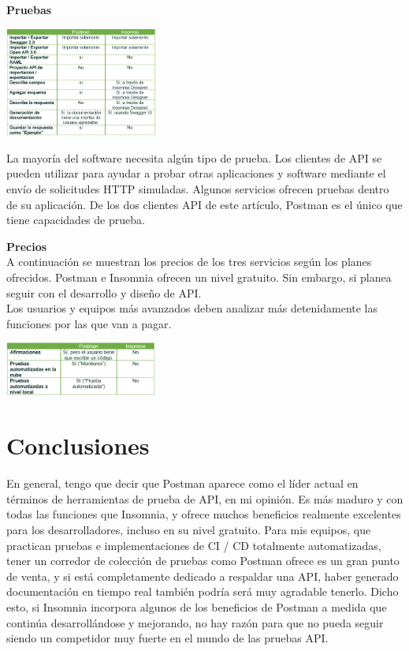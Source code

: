 \documentclass[twoside,twocolumn]{article}
\begin{document}
\textbf{Pruebas}\\


\begin{center}
	\includegraphics[width=5cm]{./img/22.png} 
\end{center}

La mayoría del software necesita algún tipo de prueba. Los clientes de API se pueden utilizar para ayudar a probar otras aplicaciones y software mediante el envío de solicitudes HTTP simuladas. Algunos servicios ofrecen pruebas dentro de su aplicación. De los dos clientes API de este artículo, Postman es el único que tiene capacidades de prueba.

\textbf{Precios}\\


A continuación se muestran los precios de los tres servicios según los planes ofrecidos. Postman e Insomnia ofrecen un nivel gratuito. Sin embargo, si planea seguir con el desarrollo y diseño de API.
\\Los usuarios y equipos más avanzados deben analizar más detenidamente las funciones por las que van a pagar.

\begin{center}
	\includegraphics[width=5cm]{./img/23.png} 
\end{center}



\section{Conclusiones}
En general, tengo que decir que Postman aparece como el líder actual en términos de herramientas de prueba de API, en mi opinión. Es más maduro y con todas las funciones que Insomnia, y ofrece muchos beneficios realmente excelentes para los desarrolladores, incluso en su nivel gratuito.
Para mis equipos, que practican pruebas e implementaciones de CI / CD totalmente automatizadas, tener un corredor de colección de pruebas como Postman ofrece es un gran punto de venta, y si está completamente dedicado a respaldar una API, haber generado documentación en tiempo real también podría será muy agradable tenerlo.
Dicho esto, si Insomnia incorpora algunos de los beneficios de Postman a medida que continúa desarrollándose y mejorando, no hay razón para que no pueda seguir siendo un competidor muy fuerte en el mundo de las pruebas API.
\end{document}
